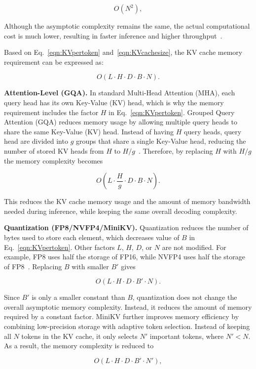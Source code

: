 \documentclass[conference]{IEEEtran}
\begin{document}
\[
	O(N^2),
\]

Although the asymptotic complexity remains the same, the actual computational cost is much lower, resulting in faster inference and higher throughput~\cite{xu2026kv}.

Based on Eq.~\eqref{eqn:KVpertoken} and~\eqref{eqn:KVcachesize}, the KV cache memory requirement can be expressed as:

\[
	O(L \cdot H \cdot D \cdot B \cdot N).
\]


\textbf{Attention-Level (GQA).} In standard Multi-Head Attention (MHA), each query head has its own Key-Value (KV) head, which is why the memory requirement includes the factor $H$ in Eq.~\eqref{eqn:KVpertoken}. Grouped Query Attention (GQA) reduces memory usage by allowing multiple query heads to share the same Key-Value (KV) head. Instead of having $H$ query heads, query head are divided into $g$ groups that share a single Key-Value head, reducing the number of stored KV heads from $H$ to $H/g$~\cite{ainslie2023gqa}. Therefore, by replacing  $H$ with $H/g$ the memory complexity becomes

\[
	O\left(
	L\cdot\frac{H}{g}\cdot D\cdot B\cdot N
	\right).
\]

This reduces the KV cache memory usage and the amount of memory bandwidth needed during inference, while keeping the same overall decoding complexity.


\textbf{Quantization (FP8/NVFP4/MiniKV).} Quantization reduces the number of bytes used to store each element, which decreases value of $B$ in Eq.~\eqref{eqn:KVpertoken}. Other factors $L$, $H$, $D$, or $N$ are not modified. For example, FP8 uses half the storage of FP16, while NVFP4 uses half the storage of FP8~\cite{nvidia2025nvfp4}. Replacing  $B$ with smaller $B'$ gives

\[
	O(L\cdot H\cdot D\cdot B'\cdot N).
\]

Since $B'$ is only a smaller constant than $B$, quantization does not change the overall asymptotic memory complexity. Instead, it reduces the amount of memory required by a constant factor. MiniKV further improves memory efficiency by combining low-precision storage with adaptive token selection. Instead of keeping all $N$ tokens in the KV cache, it only selects $N'$ important tokens, where $N'< N$. As a result, the memory complexity is reduced to

\[
	O(L\cdot H\cdot D\cdot B'\cdot N'),
\]
\end{document}
